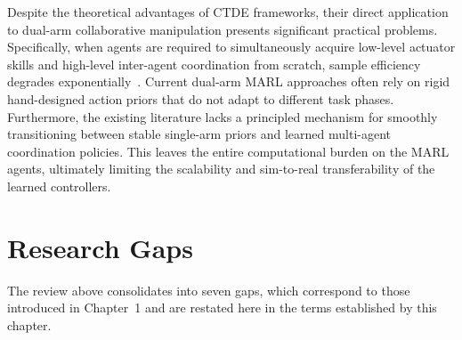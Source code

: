 Despite the theoretical advantages of CTDE frameworks, their direct application to dual-arm
collaborative manipulation presents significant practical problems. Specifically, when agents are
required to simultaneously acquire low-level actuator skills and high-level inter-agent coordination
from scratch, sample efficiency degrades exponentially~\citep{yu2022surprising, zhu2020ingredients}. Current dual-arm MARL approaches often rely on rigid hand-designed action priors that do not adapt to different task phases. Furthermore, the existing literature lacks a principled mechanism for smoothly transitioning between stable single-arm priors and learned multi-agent coordination policies. This leaves the entire computational burden on the MARL agents, ultimately limiting the scalability and sim-to-real transferability of the learned controllers.

\section{Research Gaps}\label{sec:lit_gaps}

The review above consolidates into seven gaps, which correspond to those introduced in Chapter~1 and
are restated here in the terms established by this chapter.

